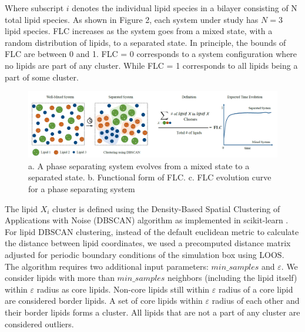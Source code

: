 \documentclass{biophys-new}
\begin{document}
Where subscript $i$ denotes the individual lipid species in a bilayer consisting of N total lipid species.
As shown in Figure 2, each system under study has $N=3$ lipid species.
FLC increases as the system goes from a mixed state, with a random distribution of lipids, to a separated state.
In principle, the bounds of FLC are between 0 and 1.
FLC = 0 corresponds to a system configuration where no lipids are part of any cluster.
While FLC = 1 corresponds to all lipids being a part of some cluster. 

\begin{figure}[hbt!]
\centering
\includegraphics[width=1\linewidth]{Figures/Figure1.PNG}
\caption{a. A phase separating system evolves from a mixed state to a separated state. b. Functional form of FLC. c. FLC evolution curve for a phase separating system}
\label{fig2:view}

\end{figure}


The lipid $X_i$ cluster is defined using the Density-Based Spatial Clustering of Applications with Noise (DBSCAN) algorithm \cite{MartinEsterHans-PeterKriegelJiirgSander1996, Ester2017} as implemented in scikit-learn \cite{PedregosaF.VaroquauxG.GramfortA.MichelV.ThirionB.GriselO.BlondelM.PrettenhoferP.WeissR.andDubourgV.VanderplasJ.PassosA.CournapeauD.BrucherM.PerrotM.Duchesnay2011}.
For lipid DBSCAN clustering, instead of the default euclidean metric to calculate the distance between lipid coordinates, we used a precomputed distance matrix adjusted for periodic boundary conditions of the simulation box using LOOS.
The algorithm requires two additional input parameters: $min\_samples$ and $\varepsilon$.
We consider lipids with more than $min\_samples$ neighbors (including the lipid itself) within $\varepsilon$ radius as core lipids.
Non-core lipids still within $\varepsilon$ radius of a core lipid are considered border lipids.
A set of core lipids within $\varepsilon$ radius of each other and their border lipids forms a cluster.
All lipids that are not a part of any cluster are considered outliers.
\end{document}
